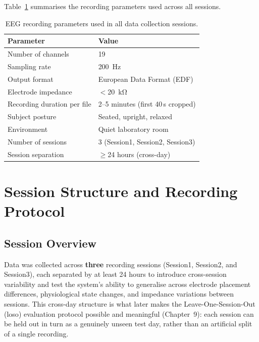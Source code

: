 Table~\ref{tab:recording_params} summarises the recording
parameters used across all sessions.

\begin{table}[htbp]
\centering
\caption{EEG recording parameters used in all data collection
sessions.}
\label{tab:recording_params}
\renewcommand{\arraystretch}{1.3}
\begin{tabular}{ll}
\toprule
\textbf{Parameter} & \textbf{Value} \\
\midrule
Number of channels          & 19 \\
Sampling rate               & \SI{200}{\hertz} \\
Output format               & European Data Format (EDF) \\
Electrode impedance         & $<$\SI{20}{\kilo\ohm} \\
Recording duration per file & 2--5 minutes (first 40\,s cropped) \\
Subject posture             & Seated, upright, relaxed \\
Environment                 & Quiet laboratory room \\
Number of sessions          & 3 (Session1, Session2, Session3) \\
Session separation          & $\geq$24 hours (cross-day) \\
\bottomrule
\end{tabular}
\end{table}

\section{Session Structure and Recording Protocol}
\label{sec:dc_protocol}

\subsection{Session Overview}

Data was collected across \textbf{three} recording sessions
(Session1, Session2, and Session3), each separated by at least
24 hours to introduce cross-session variability and test the
system's ability to generalise across electrode placement
differences, physiological state changes, and impedance
variations between sessions. This cross-day structure is what
later makes the Leave-One-Session-Out (\acrshort{loso})
evaluation protocol possible and meaningful (Chapter~9): each
session can be held out in turn as a genuinely unseen test day,
rather than an artificial split of a single recording.

